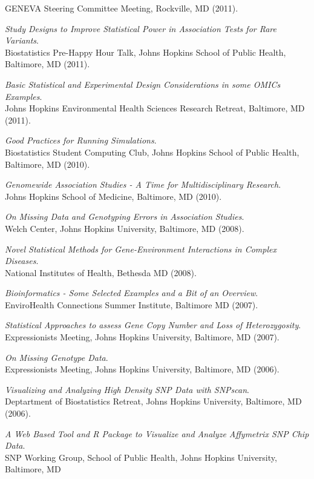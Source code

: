 \documentclass[10pt]{article}
\newcommand{\dn}[1]{{\color{black} {#1}}}
\begin{document}
GENEVA Steering Committee Meeting, \dn{Rockville, MD} 
(2011).
\item
{\it Study Designs to Improve Statistical Power in Association Tests for Rare Variants}.\\
Biostatistics Pre-Happy Hour Talk, Johns Hopkins School of Public Health, Baltimore, MD
(2011).
\item
{\it Basic Statistical and Experimental Design Considerations in some OMICs Examples}.\\
Johns Hopkins Environmental Health Sciences Research Retreat, \dn{Baltimore, MD}
(2011).
\item
{\it Good Practices for Running Simulations}.\\
Biostatistics Student Computing Club, Johns Hopkins School of Public Health, Baltimore, MD
(2010). 
\item
{\it Genomewide Association Studies - A Time for Multidisciplinary Research}.\\ 
Johns Hopkins School of Medicine, Baltimore, MD
(2010).  
\item
{\it On Missing Data and Genotyping Errors in Association Studies}.\\
Welch Center, Johns Hopkins University, Baltimore, MD
(2008).  
\item
{\it Novel Statistical Methods for Gene-Environment Interactions in Complex Diseases}.\\
National Institutes of Health, Bethesda MD 
(2008).
\item
{\it Bioinformatics - Some Selected Examples and a Bit of an Overview}.\\
EnviroHealth Connections Summer Institute, Baltimore MD
(2007).
\item
{\it Statistical Approaches to assess Gene Copy Number and Loss of Heterozygosity}.\\
Expressionists Meeting, Johns Hopkins University, Baltimore, MD
(2007).
\item
{\it On Missing Genotype Data}.\\
Expressionists Meeting, Johns Hopkins University, Baltimore, MD
(2006).
\item
{\it Visualizing and Analyzing High Density SNP Data with SNPscan}.\\
Deptartment of Biostatistics Retreat, Johns Hopkins University, Baltimore, MD
(2006).
\item
{\it A Web Based Tool and R Package to Visualize and Analyze Affymetrix SNP Chip Data}.\\ 
SNP Working Group, School of Public Health, Johns Hopkins University, Baltimore, MD
\end{document}
